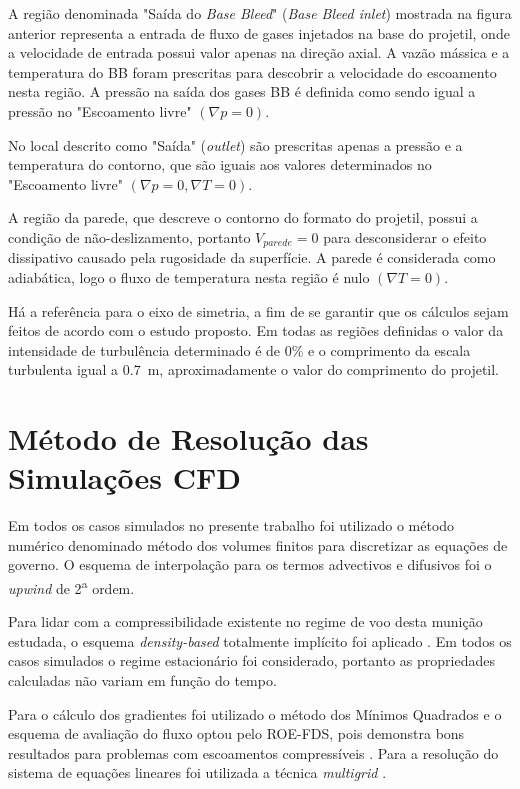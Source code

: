 A região denominada "Saída do \textit{Base Bleed}"{} (\textit{Base Bleed inlet}) mostrada na figura anterior representa a entrada de fluxo de gases injetados na base do projetil, onde a velocidade de entrada possui valor apenas na direção axial. A vazão mássica e a temperatura do BB foram prescritas para descobrir a velocidade do escoamento nesta região. A pressão na saída dos gases BB é definida como sendo igual a pressão no "Escoamento livre"{} $\left(\nabla p = 0\right)$.

No local descrito como "Saída"{} (\textit{outlet}) são prescritas apenas a pressão e a temperatura do contorno, que são iguais aos valores determinados no "Escoamento livre"{} $\left(\nabla p = 0, \nabla T = 0\right)$.

A região da parede, que descreve o contorno do formato do projetil, possui a condição de não-deslizamento, portanto $V_{parede} = 0$ para desconsiderar o efeito dissipativo causado pela rugosidade da superfície. A parede é considerada como adiabática, logo o fluxo de temperatura nesta região é nulo $\left(\nabla T = 0\right)$.

Há a referência para o eixo de simetria, a fim de se garantir que os cálculos sejam feitos de acordo com o estudo proposto. Em todas as regiões definidas o valor da intensidade de turbulência determinado é de 0\% e o comprimento da escala turbulenta igual a \qty{0,7}{\metre}, aproximadamente o valor do comprimento do projetil.

\section{Método de Resolução das Simulações CFD}\label{sec:metodo-resolucao-cfd}

Em todos os casos simulados no presente trabalho foi utilizado o método numérico denominado método dos volumes finitos \cite{McDonald1971,MacComarck&Paulay1972} para discretizar as equações de governo. O esquema de interpolação para os termos advectivos e difusivos foi o \textit{upwind} de 2\textsuperscript{a} ordem. 

Para lidar com a compressibilidade existente no regime de voo desta munição estudada, o esquema \textit{density-based} totalmente implícito foi aplicado \cite{Weiss1995PreconditioningAT,Weiss1997IMPLICITSO,Weiss1999ImplicitSO}. Em todos os casos simulados o regime estacionário foi considerado, portanto as propriedades calculadas não variam em função do tempo. 

Para o cálculo dos gradientes foi utilizado o método dos Mínimos Quadrados e o esquema de avaliação do fluxo optou pelo ROE-FDS, pois demonstra bons resultados para problemas com escoamentos compressíveis \cite{nicolas-perez_accuracy_2017}. Para a resolução do sistema de equações lineares foi utilizada a técnica \textit{multigrid} \cite{Hutchinson1986}.

